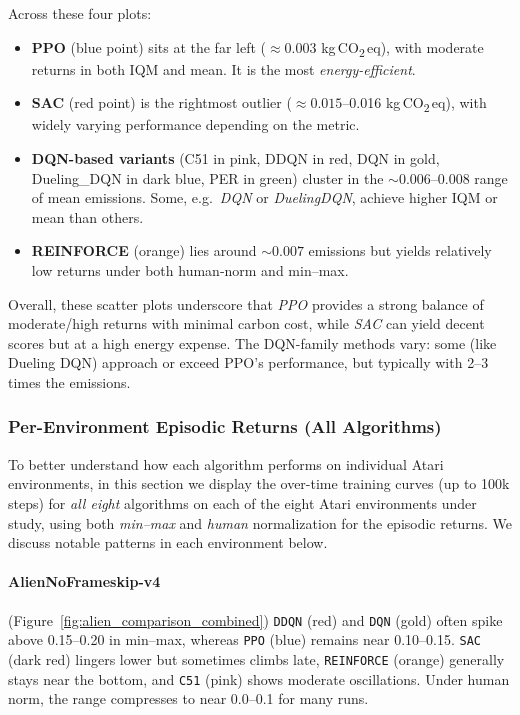 Across these four plots:
\begin{itemize}
	\item \textbf{PPO} (blue point) sits at the far left (\(\approx 0.003\) kg\,CO\textsubscript{2}\,eq), 
	with moderate returns in both IQM and mean. It is the most \emph{energy-efficient}.
	\item \textbf{SAC} (red point) is the rightmost outlier (\(\approx 0.015\)–0.016 kg\,CO\textsubscript{2}\,eq), 
	with widely varying performance depending on the metric. 
	\item \textbf{DQN-based variants} (C51 in pink, DDQN in red, DQN in gold,
	Dueling\_DQN in dark blue, PER in green) cluster in the \(\sim0.006\)--0.008 range
	of mean emissions. Some, e.g.\ \emph{DQN} or \emph{DuelingDQN}, achieve higher 
	IQM or mean than others.
	\item \textbf{REINFORCE} (orange) lies around \(\sim0.007\) emissions but yields 
	relatively low returns under both human‐norm and min–max.
\end{itemize}
Overall, these scatter plots underscore that \textit{PPO} provides a strong balance of 
moderate/high returns with minimal carbon cost, while \textit{SAC} can yield decent 
scores but at a high energy expense. The DQN-family methods vary: some (like 
Dueling DQN) approach or exceed PPO's performance, but typically with 2--3 times the emissions.

\subsubsection{Per-Environment Episodic Returns (All Algorithms)}
\label{sssec:per_env_all}

To better understand how each algorithm performs on individual Atari environments,
in this section we display the over-time training curves (up to 100k steps) for 
\emph{all eight} algorithms on each of the eight Atari environments under study, 
using both \textit{min--max} and \textit{human} normalization for the episodic returns. 
We discuss notable patterns in each environment below.

\paragraph{AlienNoFrameskip-v4}
(Figure~\ref{fig:alien_comparison_combined})
\texttt{DDQN} (red) and \texttt{DQN} (gold) often spike above 0.15--0.20 in min--max, 
whereas \texttt{PPO} (blue) remains near 0.10--0.15. 
\texttt{SAC} (dark red) lingers lower but sometimes climbs late, 
\texttt{REINFORCE} (orange) generally stays near the bottom, and \texttt{C51} (pink) 
shows moderate oscillations. 
Under human norm, the range compresses to near 0.0--0.1 for many runs.

